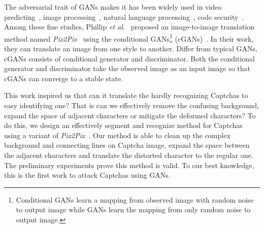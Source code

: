 The adversarial trait of GANs makes it has been widely used in video predicting~\cite{Walker2017The}, image processing~\cite{pix2pix2016,CycleGAN2017}, natural language processing~\cite{Yu2016SeqGAN,Li2017Adversarial}, code security~\cite{Xu2016Automatically,Liu2016Delving}. Among these fine studies, Phillip \emph{et al.}~\cite{pix2pix2016} proposed an image-to-image translation method named \emph{Pix2Pix}~\cite{Pix2PixCode} using the conditional GANs\footnote{Conditional GANs learn a mapping from observed image with random noise to output image while GANs learn the mapping from only random noise to output image.} (cGANs)~\cite{Mirza2014Conditional}.
In their work, they can translate an image from one style to another.
Differ from typical GANs, cGANs consists of conditional generator and discriminator. Both the conditional generator and discriminator take the observed image as an input image so that cGANs can converge to a stable state.

This work inspired us that can it translate the hardly recognizing Captchas to easy identifying one?
That is can we effectively remove the confusing background, expand the space of adjacent characters or mitigate the deformed characters?
To do this, we design an effectively segment and recognize method for Captchas using a variant of \emph{Pix2Pix}~\cite{Pix2PixCode}.
Our method is able to clean up the complex background and connecting lines on Captcha image, expand the space between the adjacent characters and translate the distorted character to the regular one.
The preliminary experiments prove this method is valid. To our best knowledge, this is the first work to attack Captchas using GANs. 